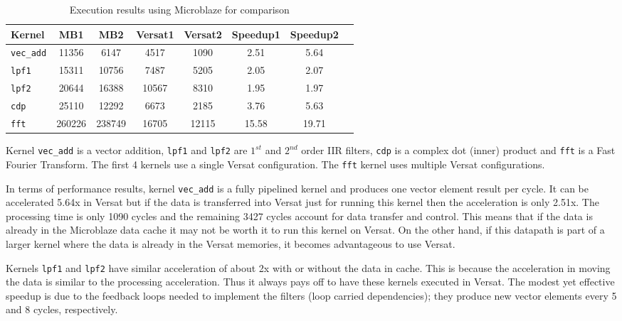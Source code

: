 \begin{table}[!htb]
  \renewcommand{\arraystretch}{1.2} %
  \caption{Execution results using Microblaze for comparison}
  \label{tabExecR}
  \centering
  \begin{tabular}{lccccccc}
    \toprule
    Kernel & MB1 & MB2 & Versat1 & Versat2 & Speedup1 & Speedup2\\
    \midrule
    {\tt vec\_add} &  11356 &   6147 &  4517 &  1090 &   2.51 &  5.64\\
    {\tt lpf1}     &  15311 &  10756 &  7487 &  5205 &   2.05 &  2.07\\
    {\tt lpf2}     &  20644 &  16388 & 10567 &  8310 &   1.95 &  1.97\\
    {\tt cdp}      &  25110 &  12292 &  6673 &  2185 &   3.76 &  5.63\\
    {\tt fft}      & 260226 & 238749 & 16705 & 12115 &  15.58 & 19.71\\
    \bottomrule
  \end{tabular}
\end{table}

Kernel {\tt vec\_add} is a vector addition, {\tt lpf1} and {\tt lpf2}
are $1^{st}$ and $2^{nd}$ order IIR filters, {\tt cdp} is a complex
dot (inner) product and {\tt fft} is a Fast Fourier Transform. The
first 4 kernels use a single Versat configuration. The {\tt fft}
kernel uses multiple Versat configurations.

In terms of performance results, kernel {\tt vec\_add} is a fully
pipelined kernel and produces one vector element result per cycle. It
can be accelerated 5.64x in Versat but if the data is transferred into
Versat just for running this kernel then the acceleration is only
2.51x. The processing time is only 1090 cycles and the remaining 3427
cycles account for data transfer and control.  This means that if the
data is already in the Microblaze data cache it may not be worth it to
run this kernel on Versat. On the other hand, if this datapath is part
of a larger kernel where the data is already in the Versat memories,
it becomes advantageous to use Versat.

Kernels {\tt lpf1} and {\tt lpf2} have similar acceleration of about
2x with or without the data in cache. This is because the acceleration
in moving the data is similar to the processing acceleration. Thus it
always pays off to have these kernels executed in Versat. The modest
yet effective speedup is due to the feedback loops needed to implement
the filters (loop carried dependencies); they produce new vector
elements every 5 and 8 cycles, respectively.

